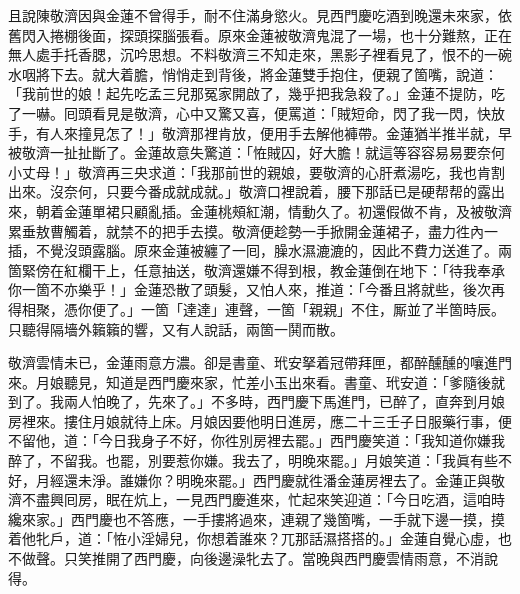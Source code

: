 且說陳敬濟因與金蓮不曾得手，耐不住滿身慾火。見西門慶吃酒到晚還未來家，依舊閃入捲棚後面，探頭探腦張看。原來金蓮被敬濟鬼混了一場，也十分難熬，正在無人處手托香腮，沉吟思想。不料敬濟三不知走來，黑影子裡看見了，恨不的一碗水咽將下去。就大着膽，悄悄走到背後，將金蓮雙手抱住，便親了箇嘴，說道：「我前世的娘！起先吃孟三兒那冤家開啟了，幾乎把我急殺了。」金蓮不提防，吃了一嚇。囘頭看見是敬濟，心中又驚又喜，便罵道：{}「賊短命，閃了我一閃，快放手，有人來撞見怎了！」敬濟那裡肯放，便用手去解他褲帶。金蓮猶半推半就，早被敬濟一扯扯斷了。金蓮故意失驚道：「恠賊囚，好大膽！就這等容容易易要奈何小丈母！」{}敬濟再三央求道：「我那前世的親娘，要敬濟的心肝煮湯吃，我也肯割出來。沒奈何，只要今番成就成就。」敬濟口裡說着，腰下那話已是硬帮帮的露出來，朝着金蓮單裙只顧亂插。金蓮桃頰紅潮，情動久了。初還假做不肯，{}及被敬濟累垂敖曹觸着，就禁不的把手去摸。{}敬濟便趁勢一手掀開金蓮裙子，盡力徃內一插，不覺沒頭露腦。原來金蓮被纏了一囘，臊水濕漉漉的，因此不費力送進了。兩箇緊傍在紅欄干上，任意抽送，敬濟還嫌不得到根，教金蓮倒在地下：「待我奉承你一箇不亦樂乎！」金蓮恐散了頭髮，又怕人來，{}推道：「今番且將就些，後次再得相聚，憑你便了。」{}一箇「達達」連聲，一箇「親親」不住，厮並了半箇時辰。只聽得隔墻外籟籟的響，又有人說話，兩箇一鬨而散。

敬濟雲情未已，金蓮雨意方濃。卻是書童、玳安拏着冠帶拜匣，都醉醺醺的嚷進門來。月娘聽見，知道是西門慶來家，忙差小玉出來看。書童、玳安道：「爹隨後就到了。我兩人怕晚了，先來了。」不多時，西門慶下馬進門，已醉了，直奔到月娘房裡來。摟住月娘就待上床。月娘因要他明日進房，應二十三壬子日服藥行事，便不留他，道：「今日我身子不好，你徃別房裡去罷。」西門慶笑道：「我知道你嫌我醉了，不留我。也罷，別要惹你嫌。我去了，明晚來罷。」{}月娘笑道：「我眞有些不好，月經還未淨。誰嫌你？明晚來罷。」西門慶就徃潘金蓮房裡去了。金蓮正與敬濟不盡興囘房，眠在炕上，一見西門慶進來，忙起來笑迎道：「今日吃酒，這咱時纔來家。」西門慶也不答應，一手摟將過來，連親了幾箇嘴，一手就下邊一摸，摸着他牝戶，道：「恠小淫婦兒，你想着誰來？兀那話濕搭搭的。」{}金蓮自覺心虛，也不做聲。{}只笑推開了西門慶，向後邊澡牝去了。當晚與西門慶雲情雨意，不消說得。

